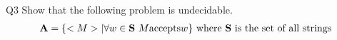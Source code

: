\begin{problem}
    {Q3}
    Show that the following problem is undecidable. \\
    \begin{align*}
        \textbf{A} = \{<M> | \forall w \in \textbf{S}~M \text{accepts} w\} \text{ where \textbf{S} is the set of all strings}
    \end{align*}
\end{problem}
